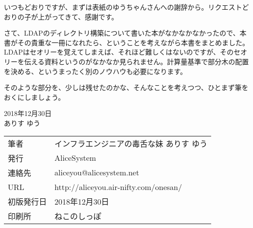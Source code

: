 いつもどおりですが、まずは表紙のゆうちゃんさんへの謝辞から。リクエストどおりの子が上がってきて、感謝です。

さて、LDAPのディレクトリ構築について書いた本がなかなかなかったので、本書がその貴重な一冊になれたら、ということを考えながら本書をまとめました。
LDAPはセオリーを覚えてしまえば、それほど難しくはないのですが、そのセオリーを伝える資料というのがなかなか見られません。計算量基準で部分木の配置を決める、というまったく別のノウハウも必要になります。

そのような部分を、少しは残せたのかな、そんなことを考えつつ、ひとまず筆をおくにしましょう。

\begin{flushright}
2018年12月30日 \\
ありす ゆう
\end{flushright}



\thispagestyle{empty}
\mbox{}
\newpage
\clearpage

\thispagestyle{empty}
\mbox{}
\newpage
\clearpage



\thispagestyle{empty}

\vspace*{\fill}
\begin{tabular}{ll} \toprule
筆者 & インフラエンジニアの毒舌な妹 ありす ゆう\\
発行 & AliceSystem \\
連絡先 & aliceyou@alicesystem.net \\
URL & http://aliceyou.air-nifty.com/onesan/ \\
初版発行日 & 2018年12月30日 \\
印刷所 & ねこのしっぽ \\ \bottomrule
\end{tabular}